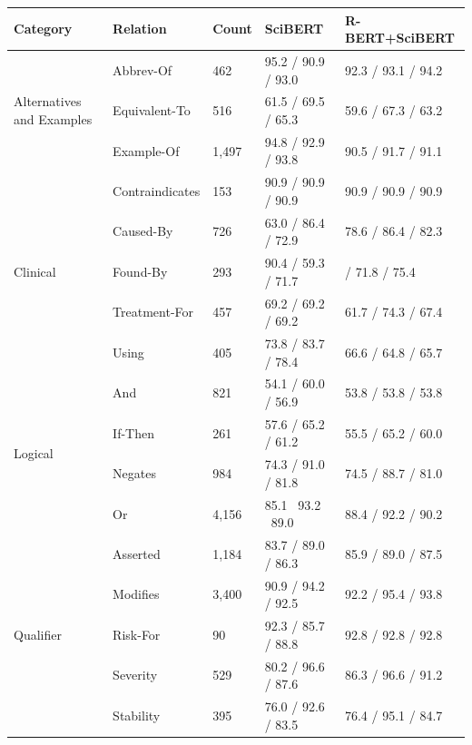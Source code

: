 \documentclass[fleqn,10pt]{wlscirep}
\begin{document}
\begin{table}
    \centering
    \def\arraystretch{1.4}
\begin{tabular}{m{4.5cm} m{2.5cm} m{2cm} m{2.8cm} m{3cm}}
\toprule
    \textbf{Category} & \textbf{Relation} & \textbf{Count} & \textbf{SciBERT} & \textbf{R-BERT+SciBERT} \\ \midrule
     & Abbrev-Of &           462 & 95.2 / 90.9 / 93.0 & 92.3 / 93.1 / 94.2 \\
    Alternatives and Examples & Equivalent-To & 516 & 61.5 / 69.5 / 65.3 & 59.6 / 67.3 / 63.2 \\
     &                       Example-Of & 1,497 & 94.8 / 92.9 / 93.8 & 90.5 / 91.7 / 91.1 \\
    \hline
     &                       Contraindicates & 153 & 90.9 / 90.9 / 90.9 & 90.9 / 90.9 / 90.9 \\
     &                       Caused-By & 726 & 63.0 / 86.4 / 72.9 & 78.6 / 86.4 / 82.3 \\
     Clinical &              Found-By & 293 & 90.4 / 59.3 / 71.7 & \79.3 / 71.8 / 75.4 \\
     &                       Treatment-For & 457 & 69.2 / 69.2 / 69.2 & 61.7 / 74.3 / 67.4 \\
     &                       Using & 405 & 73.8 / 83.7 / 78.4 & 66.6 / 64.8 / 65.7 \\
    \hline
    \multirow{4}{}[0pt]{\mbox{Logical}} & And & 821 & 54.1 / 60.0 / 56.9 & 53.8 / 53.8 / 53.8 \\
     &                       If-Then & 261 & 57.6 / 65.2 / 61.2 & 55.5 / 65.2 / 60.0 \\
     &                       Negates & 984 & 74.3 / 91.0 / 81.8 & 74.5 / 88.7 / 81.0 \\
     &                       Or & 4,156 & 85.1 \ 93.2 \ 89.0 & 88.4 / 92.2 / 90.2 \\
    \hline
     &               Asserted & 1,184 & 83.7 / 89.0 / 86.3 & 85.9 / 89.0 / 87.5 \\
     &                       Modifies & 3,400 & 90.9 / 94.2 / 92.5 & 92.2 / 95.4 / 93.8 \\
    Qualifier &               Risk-For & 90 & 92.3 / 85.7 / 88.8 & 92.8 / 92.8 / 92.8 \\
     &                       Severity & 529 & 80.2 / 96.6 / 87.6 & 86.3 / 96.6 / 91.2 \\
     &                       Stability & 395 & 76.0 / 92.6 / 83.5 & 76.4 / 95.1 / 84.7 \\
    \hline

\end{tabular}
\end{table}
\end{document}
